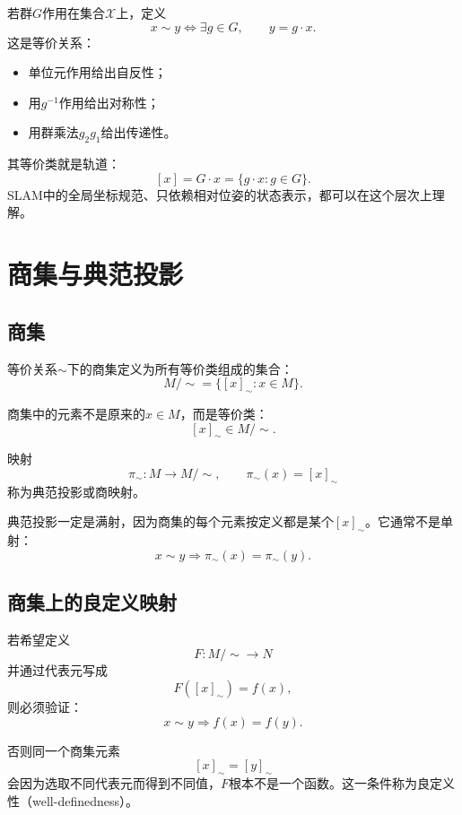 若群$G$作用在集合$\mathcal X$上，定义
\[
    x\sim y
    \Longleftrightarrow
    \exists g\in G,\qquad y=g\cdot x.
\]
这是等价关系：

\begin{itemize}
    \item 单位元作用给出自反性；
    \item 用$g^{-1}$作用给出对称性；
    \item 用群乘法$g_2g_1$给出传递性。
\end{itemize}

其等价类就是轨道：
\[
    [x]
    =
    G\cdot x
    =
    \{g\cdot x:g\in G\}.
\]
SLAM中的全局坐标规范、只依赖相对位姿的状态表示，都可以在这个层次上理解。


\section{商集与典范投影}

\subsection{商集}

\begin{definition}[商集]
等价关系$\sim$下的商集定义为所有等价类组成的集合：
\[
    M/{\sim}
    =
    \{[x]_{\sim}:x\in M\}.
\]
\end{definition}

商集中的元素不是原来的$x\in M$，而是等价类：
\[
    [x]_{\sim}\in M/{\sim}.
\]

\begin{definition}[典范投影]
映射
\[
    \pi_{\sim}:M\to M/{\sim},
    \qquad
    \pi_{\sim}(x)=[x]_{\sim}
\]
称为典范投影或商映射。
\end{definition}

典范投影一定是满射，因为商集的每个元素按定义都是某个$[x]_{\sim}$。它通常不是单射：
\[
    x\sim y
    \Longrightarrow
    \pi_{\sim}(x)=\pi_{\sim}(y).
\]

\subsection{商集上的良定义映射}

若希望定义
\[
    F:M/{\sim}\to N
\]
并通过代表元写成
\[
    F([x]_{\sim})=f(x),
\]
则必须验证：
\[
    x\sim y
    \Longrightarrow
    f(x)=f(y).
\]

否则同一个商集元素
\[
    [x]_{\sim}=[y]_{\sim}
\]
会因为选取不同代表元而得到不同值，$F$根本不是一个函数。这一条件称为良定义性（well-definedness）。

